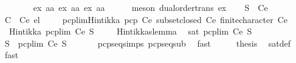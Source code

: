 \begin{isabellebody}
\ \ \ \ \ \ \isamarkupfalse%
\ ex{}{\isacharbrackleft}\ {\isacharprime}a{\isacharequal}{\isacharprime}a{\isacharbrackright}\ ex{}{\isacharbrackleft}\ {\isacharprime}a{\isacharequal}{\isacharprime}a{\isacharbrackright}\ ex{}{\isacharbrackleft}\ {\isacharprime}a{\isacharequal}{\isacharprime}a{\isacharbrackright}\isanewline
\ \ \ \ \isamarkupfalse%
\ {\isacharparenleft}meson\ dual{\isacharunderscore}order{\isachardot}trans\ ex{}{\isacharparenright}\isanewline
\ \ \isamarkupfalse%
\ {\isachardoublequoteopen}S\ {\isasymin}\ Ce{\isachardoublequoteclose}\ \isamarkupfalse%
\ {\isacartoucheopen}C\ {\isasymsubseteq}\ Ce{\isacartoucheclose}\ el\ \isacommand{{\isachardot}{\isachardot}}\isamarkupfalse%
\isanewline
\ \ \isamarkupfalse%
\ pcp{\isacharunderscore}lim{\isacharunderscore}Hintikka\ {\isacartoucheopen}pcp\ Ce{\isacartoucheclose}\ {\isacartoucheopen}subset{\isacharunderscore}closed\ Ce{\isacartoucheclose}\ {\isacartoucheopen}finite{\isacharunderscore}character\ Ce{\isacartoucheclose}\isanewline
\ \ \isamarkupfalse%
\ \ {\isachardoublequoteopen}Hintikka\ {\isacharparenleft}pcp{\isacharunderscore}lim\ Ce\ S{\isacharparenright}{\isachardoublequoteclose}\ \isacommand{{\isachardot}}\isamarkupfalse%
\isanewline
\ \ \isamarkupfalse%
\ Hintikkaslemma\ \isamarkupfalse%
\ {\isachardoublequoteopen}sat\ {\isacharparenleft}pcp{\isacharunderscore}lim\ Ce\ S{\isacharparenright}{\isachardoublequoteclose}\ \isacommand{{\isachardot}}\isamarkupfalse%
\isanewline
\ \ \isamarkupfalse%
\ \isamarkupfalse%
\ {\isachardoublequoteopen}S\ {\isasymsubseteq}\ pcp{\isacharunderscore}lim\ Ce\ S{\isachardoublequoteclose}\ \isanewline
\ \ \ \ \isamarkupfalse%
\ pcp{\isacharunderscore}seq{\isachardot}simps{\isacharparenleft}{}{\isacharparenright}\ pcp{\isacharunderscore}seq{\isacharunderscore}sub\ \isamarkupfalse%
\ fast\isanewline
\ \ \isamarkupfalse%
\ \isamarkupfalse%
\ {\isacharquery}thesis\ \isamarkupfalse%
\ sat{\isacharunderscore}def\ \isamarkupfalse%
\ fast\isanewline
{}\isamarkupfalse%
\isanewline
%
\endisatagproof
{\isafoldproof}%
%
\isadelimproof
%
\endisadelimproof
%
\isadelimtheory
%
\endisadelimtheory
%
\isatagtheory
%
\endisatagtheory
{\isafoldtheory}%
%
\isadelimtheory
%
\endisadelimtheory
%
\end{isabellebody}%
